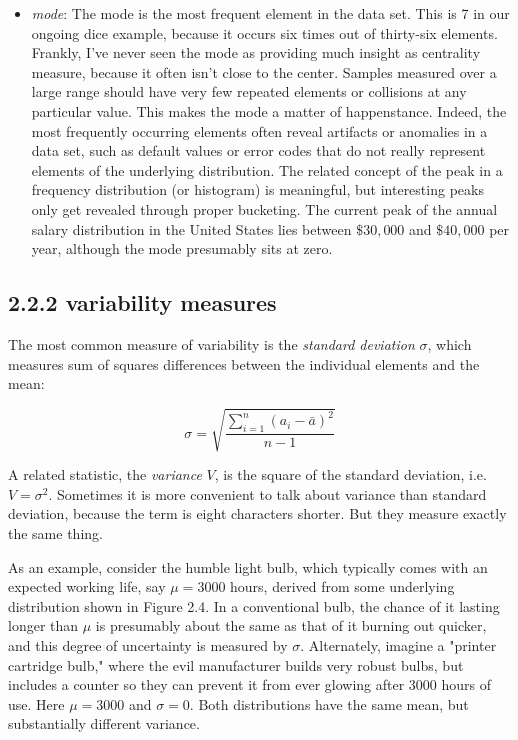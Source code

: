 \documentclass[10pt]{article}
\begin{document}
\begin{itemize}
  \item \textit{mode}: The mode is the most frequent element in the data set. This is 7 in our ongoing dice example, because it occurs six times out of thirty-six elements. Frankly, I've never seen the mode as providing much insight as centrality measure, because it often isn't close to the center. Samples measured over a large range should have very few repeated elements or collisions at any particular value. This makes the mode a matter of happenstance. Indeed, the most frequently occurring elements often reveal artifacts or anomalies in a data set, such as default values or error codes that do not really represent elements of the underlying distribution.
The related concept of the peak in a frequency distribution (or histogram) is meaningful, but interesting peaks only get revealed through proper bucketing. The current peak of the annual salary distribution in the United States lies between $\$ 30,000$ and $\$ 40,000$ per year, although the mode presumably sits at zero.
\end{itemize}

\subsection*{2.2.2 variability measures}
The most common measure of variability is the \textit{standard deviation} \(\sigma\), which measures sum of squares differences between the individual elements and the mean:

\[
\sigma=\sqrt{\frac{\sum_{i=1}^{n}\left(a_{i}-\bar{a}\right)^{2}}{n-1}}
\]

A related statistic, the \textit{variance} \(V\), is the square of the standard deviation, i.e. \(V=\sigma^{2}\). Sometimes it is more convenient to talk about variance than standard deviation, because the term is eight characters shorter. But they measure exactly the same thing.

As an example, consider the humble light bulb, which typically comes with an expected working life, say \(\mu=3000\) hours, derived from some underlying distribution shown in Figure 2.4. In a conventional bulb, the chance of it lasting longer than \(\mu\) is presumably about the same as that of it burning out quicker, and this degree of uncertainty is measured by \(\sigma\). Alternately, imagine a "printer cartridge bulb," where the evil manufacturer builds very robust bulbs, but includes a counter so they can prevent it from ever glowing after 3000 hours of use. Here \(\mu=3000\) and \(\sigma=0\). Both distributions have the same mean, but substantially different variance.
\end{document}

